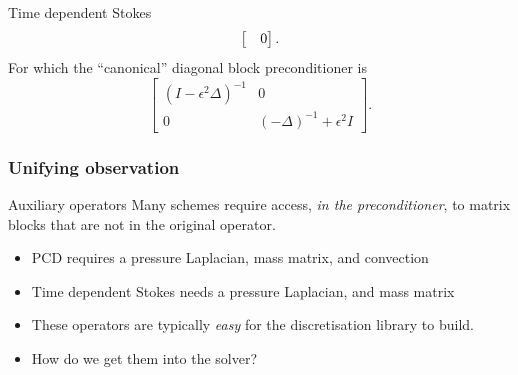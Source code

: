 \documentclass[presentation,aspectratio=43, 10pt]{beamer}
\let\div\relax
\DeclareMathOperator{\div}{div}
\begin{document}
\begin{frame}[t]
\begin{onlyenv}
\begin{block}{Time dependent Stokes}
\begin{equation*}
\begin{bmatrix}
          \div & 0
        \end{bmatrix}.
      \end{equation*}
      For which the ``canonical'' diagonal block preconditioner is
      \begin{equation*}
        \begin{bmatrix}
          (I - \epsilon^2 \Delta)^{-1} & 0\\
          0 & (-\Delta)^{-1} + \epsilon^2 I
        \end{bmatrix}.
      \end{equation*}
      \begin{flushright}
        \textcite{Mardal:2011} \hspace{4em}
      \end{flushright}
    \end{block}
  \end{onlyenv}

\end{frame}

\begin{frame}
  \frametitle{Unifying observation}
  \begin{block}{Auxiliary operators}
    Many schemes require access, \emph{in the preconditioner}, to
    matrix blocks that are not in the original operator.
  \end{block}
  \begin{example}
    \begin{itemize}
    \item PCD requires a pressure Laplacian, mass matrix, and
      convection
    \item Time dependent Stokes needs a pressure Laplacian, and mass
      matrix
    \end{itemize}
  \end{example}
  \begin{itemize}
  \item These operators are typically \emph{easy} for the
    discretisation library to build.
  \item How do we get them into the solver?
  \end{itemize}
\end{frame}
\end{document}
